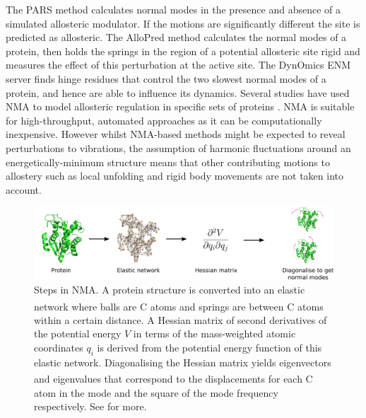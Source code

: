 The PARS method \cite{Panjkovich2012, Panjkovich2014} calculates normal modes in the presence and absence of a simulated allosteric modulator.
If the motions are significantly different the site is predicted as allosteric.
The AlloPred method \cite{Greener2015} calculates the normal modes of a protein, then holds the springs in the region of a potential allosteric site rigid and measures the effect of this perturbation at the active site.
The DynOmics ENM server \cite{Li2017} finds hinge residues that control the two slowest normal modes of a protein, and hence are able to influence its dynamics.
Several studies have used NMA to model allosteric regulation in specific sets of proteins \cite{Balabin2009, Rodgers2013, Zheng2007}.
NMA is suitable for high-throughput, automated approaches as it can be computationally inexpensive.
However whilst NMA-based methods might be expected to reveal perturbations to vibrations, the assumption of harmonic fluctuations around an energetically-minimum structure means that other contributing motions to allostery such as local unfolding and rigid body movements \cite{Motlagh2014} are not taken into account.


\begin{figure}
\centering

\includegraphics[width=\textwidth]{figures/nma/nma}

\caption[Steps in normal mode analysis]
{Steps in NMA.
A protein structure is converted into an elastic network where balls are C\textsuperscript{\textalpha} atoms and springs are between C\textsuperscript{\textalpha} atoms within a certain distance.
A Hessian matrix of second derivatives of the potential energy $V$ in terms of the mass-weighted atomic coordinates $q_{i}$ is derived from the potential energy function of this elastic network.
Diagonalising the Hessian matrix yields eigenvectors and eigenvalues that correspond to the displacements for each C\textsuperscript{\textalpha} atom in the mode and the square of the mode frequency respectively.
See \cite{Hayward2008} for more.}

\label{fig:nma}
\end{figure}


